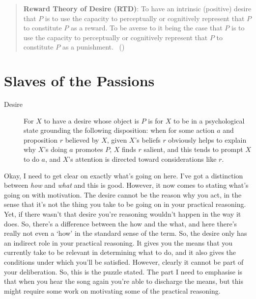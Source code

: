 \documentclass[10pt]{article}
\begin{document}
\begin{quote}
  \textbf{Reward Theory of Desire (RTD)}:
  To have an intrinsic (positive) desire that \(P\) is to use the capacity to perceptually or cognitively represent that \(P\) to constitute \(P\) as a reward.
  To be averse to it being the case that \(P\) is to use the capacity to perceptually or cognitively represent that \(P\) to constitute \(P\) as a punishment.\nolinebreak
  \mbox{ }\hfill(\citeyear[131]{Schroeder:2004aa})
\end{quote}



\section{Slaves of the Passions}
\label{sec:slaves-passions}

\begin{description}
\item[Desire]
For \(X\) to have a desire whose object is \(P\) is for \(X\) to be in a psychological state grounding the following disposition: when for some action \(a\) and proposition \(r\) believed by \(X\), given \(X\)'s beliefs \(r\) obviously helps to explain why \(X\)'s doing \(a\) promotes \(P\), \(X\) finds \(r\) salient, and this tends to prompt \(X\) to do \(a\), and \(X\)'s attention is directed toward considerations like \(r\).
\end{description}

{\color{red}
  Okay, I need to get clear on exactly what's going on here.
  I've got a distinction between \emph{how} and \emph{what} and this is good.
  However, it now comes to stating what's going on with motivation.
  The desire cannot be the reason why you act, in the sense that it's not the thing you take to be going on in your practical reasoning.
  Yet, if there wasn't that desire you're reasoning wouldn't happen in the way it does.
  So, there's a difference between the how and the what, and here there's really not even a `how' in the standard sense of the term.
  So, the desire only has an indirect role in your practical reasoning.
  It gives you the means that you currently take to be relevant in determining what to do, and it also gives the conditions under which you'll be satisfied.
  However, clearly it cannot be part of your deliberation.
  So, this is the puzzle stated.
  The part I need to emphasise is that when you hear the song again you're able to discharge the means, but this might require some work on motivating some of the practical reasoning.
}
\end{document}
